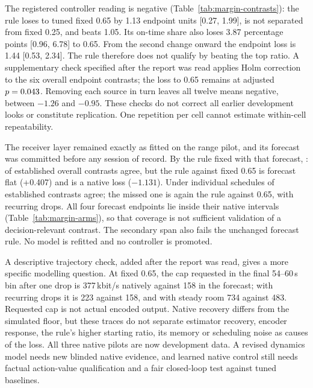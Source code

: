 \begin{table}[t]
\centering\small
\resizebox{\linewidth}{!}{}
\caption{Whole-session endpoint contrasts, with unadjusted source-level 95\% $t$ intervals. The unchanged forecast rule calls a simulated difference flat when its absolute size is below 0.5; native contrasts are established when their intervals exclude zero.}\label{tab:margin-contrasts}
\end{table}

The registered controller reading is negative (Table~\ref{tab:margin-contrasts}): the rule loses to tuned fixed 0.65 by 1.13 endpoint units [0.27, 1.99], is not separated from fixed 0.25, and beats 1.05. Its on-time share also loses 3.87 percentage points [0.96, 6.78] to 0.65. From the second change onward the endpoint loss is 1.44 [0.53, 2.34]. The rule therefore does not qualify by beating the top ratio. A supplementary check specified after the report was read applies Holm correction to the six overall endpoint contrasts; the loss to 0.65 remains at adjusted $p=0.043{}$. Removing each source in turn leaves all twelve means negative, between $-1.26$ and $-0.95$. These checks do not correct all earlier development looks or constitute replication. One repetition per cell cannot estimate within-cell repeatability.

The receiver layer remained exactly as fitted on the range pilot, and its forecast was committed before any session of record. By the rule fixed with that forecast, \emph{\MarginForecastVerdict{}}: \MarginForecastAgree{} of \MarginForecastEstablished{} established overall contrasts agree, but the rule against fixed 0.65 is forecast flat (+0.407) and is a native loss ($-1.131$). Under individual schedules \MarginForecastLocalAgree{} of \MarginForecastLocalEstablished{} established contrasts agree; the missed one is again the rule against 0.65, with recurring drops. All four forecast endpoints lie inside their native intervals (Table~\ref{tab:margin-arms}), so that coverage is not sufficient validation of a decision-relevant contrast. The secondary span also fails the unchanged forecast rule. No model is refitted and no controller is promoted.

A descriptive trajectory check, added after the report was read, gives a more specific modelling question. At fixed 0.65, the cap requested in the final 54--60\,s bin after one drop is 377\,kbit/s natively against 158 in the forecast; with recurring drops it is 223 against 158, and with steady room 734 against 483. Requested cap is not actual encoded output. Native recovery differs from the simulated floor, but these traces do not separate estimator recovery, encoder response, the rule's higher starting ratio, its memory or scheduling noise as causes of the loss. All three native pilots are now development data. A revised dynamics model needs new blinded native evidence, and learned native control still needs factual action-value qualification and a fair closed-loop test against tuned baselines.

